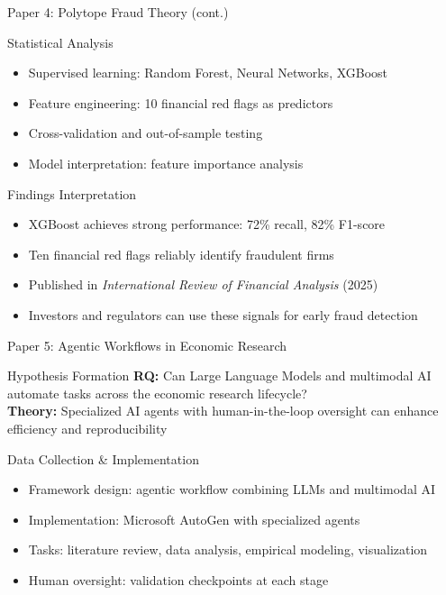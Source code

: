 \documentclass[10pt,aspectratio=169]{beamer}
\begin{document}
\begin{frame}{Paper 4: Polytope Fraud Theory (cont.)}
  \begin{block}{Statistical Analysis}
    \begin{itemize}
      \item Supervised learning: Random Forest, Neural Networks, XGBoost
      \item Feature engineering: 10 financial red flags as predictors
      \item Cross-validation and out-of-sample testing
      \item Model interpretation: feature importance analysis
    \end{itemize}
  \end{block}

  \begin{alertblock}{Findings Interpretation}
    \begin{itemize}
      \item XGBoost achieves strong performance: 72\% recall, 82\% F1-score
      \item Ten financial red flags reliably identify fraudulent firms
      \item Published in \textit{International Review of Financial Analysis} (2025)
      \item Investors and regulators can use these signals for early fraud detection
    \end{itemize}
  \end{alertblock}
\end{frame}

\begin{frame}{Paper 5: Agentic Workflows in Economic Research}
  \begin{block}{Hypothesis Formation}
    \textbf{RQ:} Can Large Language Models and multimodal AI automate tasks across the economic research lifecycle?
    \\
    \textbf{Theory:} Specialized AI agents with human-in-the-loop oversight can enhance efficiency and reproducibility
  \end{block}

  \begin{block}{Data Collection \& Implementation}
    \begin{itemize}
      \item Framework design: agentic workflow combining LLMs and multimodal AI
      \item Implementation: Microsoft AutoGen with specialized agents
      \item Tasks: literature review, data analysis, empirical modeling, visualization
      \item Human oversight: validation checkpoints at each stage
    \end{itemize}
  \end{block}
\end{frame}
\end{document}
